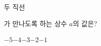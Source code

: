 두 직선 \par\smallskip{}\par\smallskip\noindent 가 만나도록 하는 상수 $a$의 값은?
\begin{choices32}{$-5$}{$-4$}{$-3$}{$-2$}{$-1$}\end{choices32}

